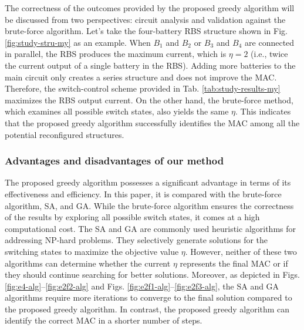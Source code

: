 \documentclass{article}
\begin{document}
The correctness of the outcomes provided by the proposed greedy algorithm will be discussed from two perspectives: circuit analysis and validation against the brute-force algorithm. 
Let's take the four-battery RBS structure shown in Fig. \ref{fig:study-stru-my} as an example.
When $B_1$ and $B_2$ or $B_3$ and $B_4$ are connected in parallel, the RBS produces the maximum current, which is $\eta=2$ (i.e., twice the current output of a single battery in the RBS). 
Adding more batteries to the main circuit only creates a series structure and does not improve the MAC. 
Therefore, the switch-control scheme provided in Tab. \ref{tab:study-results-my} maximizes the RBS output current.
On the other hand, the brute-force method, which examines all possible switch states, also yields the same $\eta$.
This indicates that the proposed greedy algorithm successfully identifies the MAC among all the potential reconfigured structures.

\subsubsection{Advantages and disadvantages of our method}

The proposed greedy algorithm possesses a significant advantage in terms of its effectiveness and efficiency. 
In this paper, it is compared with the brute-force algorithm, SA, and GA. 
While the brute-force algorithm ensures the correctness of the results by exploring all possible switch states, it comes at a high computational cost. 
The SA and GA are commonly used heuristic algorithms for addressing NP-hard problems. 
They selectively generate solutions for the switching states to maximize the objective value $\eta$.
However, neither of these two algorithms can determine whether the current $\eta$ represents the final MAC or if they should continue searching for better solutions. 
Moreover, as depicted in Figs. \ref{fig:e4-alg}--\ref{fig:e2f2-alg} and Figs. \ref{fig:e2f1-alg}--\ref{fig:e2f3-alg}, the SA and GA algorithms require more iterations to converge to the final solution compared to the proposed greedy algorithm. 
In contrast, the proposed greedy algorithm can identify the correct MAC in a shorter number of steps.
\end{document}
